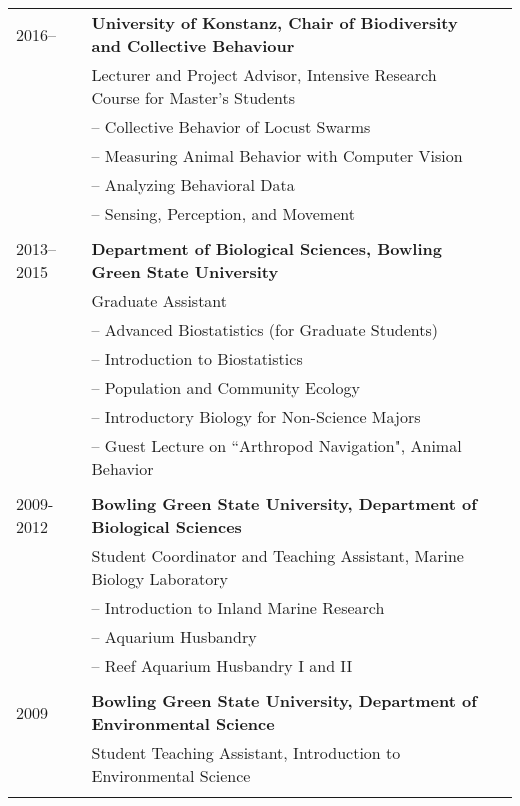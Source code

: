\documentclass[letterpaper,10pt,oneside]{article}
\begin{document}
\begin{longtable}{@{} l p{5.3in}l}
 \large{2016–}
    & \textbf{University of Konstanz, Chair of Biodiversity and Collective Behaviour} \\
     & Lecturer and Project Advisor, Intensive Research Course for Master's Students \\
   	 & – Collective Behavior of Locust Swarms \\
     & – Measuring Animal Behavior with Computer Vision \\
     & – Analyzing Behavioral Data \\
     & – Sensing, Perception, and Movement \\
     & \\
 \large{2013–2015}
 & \textbf{Department of Biological Sciences, Bowling Green State University} \\
 & Graduate Assistant \\
 & – Advanced Biostatistics (for Graduate Students)\\
 & – Introduction to Biostatistics \\
 & – Population and Community Ecology \\
 & – Introductory Biology for Non-Science Majors \\
 & – Guest Lecture on ``Arthropod Navigation", Animal Behavior \\
 & \\
 \large{2009-2012}
 & \textbf{Bowling Green State University, Department of Biological Sciences} \\
 & Student Coordinator and Teaching Assistant, Marine Biology Laboratory \\
 & – Introduction to Inland Marine Research \\
 & – Aquarium Husbandry \\
 & – Reef Aquarium Husbandry I and II \\
 & \\
 \large{2009}
 & \textbf{Bowling Green State University, Department of Environmental Science} \\
 & Student Teaching Assistant, Introduction to Environmental Science \\
 & \\
 

\end{longtable}
\end{document}
